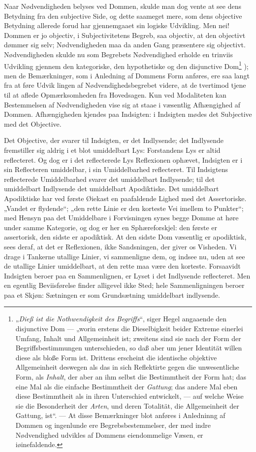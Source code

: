\documentclass[12pt]{book}
\newcommand{\opage}[1]{\marginnote{\footnotesize\textit{[#1]}}}
\begin{document}
Naar Nødvendigheden belyses ved Dommen, skulde man
dog vente at see dens Betydning fra den subjective Side, og
dette saameget mere, som dens objective Betydning allerede
forud har gjennemgaaet sin logiske Udvikling. Men nei!
Dommen er jo objectiv, i Subjectivitetens Begreb, saa objectiv,
at den objectivt dømmer sig selv; Nødvendigheden maa
da anden Gang præsentere sig objectivt. Nødvendigheden skulde
nu som Begrebets Nødvendighed erholde en trinviis Udvikling
gjennem den kategoriske, den hypothetiske og den disjunctive
Dom\footnote{„\emph{Dieß ist die Nothwendigkeit des Begriffs}“, siger Hegel
angaaende den disjunctive Dom --- „worin erstens die Dieselbigkeit
beider Extreme einerlei Umfang, Inhalt und Allgemeinheit ist;
zweitens sind sie nach der Form der Begriffsbestimmungen unterschieden,
so daß aber um jener Identität willen diese als bloße
Form ist. Drittens erscheint die identische objektive Allgemeinheit
deswegen als das in sich Reflektirte gegen die unwesentliche Form,
als \emph{Inhalt}, der aber an ihm selbst die Bestimmtheit der Form
hat; das eine Mal als die einfache Bestimmtheit der \emph{Gattung};
das andere Mal eben diese Bestimmtheit als in ihren Unterschied
entwickelt, --- auf welche Weise sie die Besonderheit der \emph{Arten},
und deren Totalität, die Allgemeinheit der Gattung, ist“. ---
At disse Bemærkninger blot anføres i Anledninng af Dommen %
og ingenlunde ere Begrebsbestemmelser, der med indre Nødvendighed
udvikles af Dommens eiendommelige Væsen, er iøinefaldende.}%
); men de Bemærkninger, som i Anledning af
Dommens Form anføres, ere saa langt fra at føre Udvik%
\opage{255}lingen af Nødvendighedsbegrebet videre, at de tvertimod tjene
til at aflede Opmærksomheden fra Hovedsagen. Kun ved
Modaliteten kan Bestemmelsen af Nødvendigheden vise sig at
staae i væsentlig Afhængighed af Dommen. Afhængigheden
kjendes paa Indsigten: i Indsigten mødes det Subjective med
det Objective.

Det Objective, der svarer til Indsigten, er det Indlysende;
det Indlysende fremstiller sig aldrig i et blot umiddelbart Lys:
Forstandens Lys er altid reflecteret. Og dog er i det reflecterede
Lys Reflexionen ophævet, Indsigten er i sin Reflecteren
umiddelbar, i sin Umiddelbarhed reflecteret. Til Indsigtens
reflecterede Umiddelbarhed svarer det umiddelbart Indlysende;
til det umiddelbart Indlysende det umiddelbart Apodiktiske.
Det umiddelbart Apodiktiske har ved første Øiekast en paafaldende
Lighed med det Assertoriske. „Vandet er flydende“; „den
rette Linie er den korteste Vei imellem to Punkter“; med Hensyn
paa det Umiddelbare i Forvisningen synes begge Domme
at høre under samme Kategorie, og dog er her en Sphæreforskjel:
den første er assertorisk, den sidste er apodiktisk. At
den sidste Dom væsentlig er apodiktisk, sees deraf, at det er
Reflexionen, ikke Sandsningen, der giver os Visheden. Vi
drage i Tankerne utallige Linier, vi sammenligne dem, og
indsee nu, uden at see de utallige Linier umiddelbart,
at den rette maa være den korteste. Forsaavidt Indsigten
beroer paa en Sammenlignen, er Lyset i det Indlysende reflecteret.
Men en egentlig Beviisførelse finder alligevel ikke Sted;
hele Sammenligningen beroer paa et Skjøn: Sætningen er
som Grundsætning umiddelbart indlysende.
\end{document}
